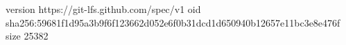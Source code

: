 version https://git-lfs.github.com/spec/v1
oid sha256:59681f1d95a3b9f6f123662d052e6f0b31dcd1d650940b12657e11bc3e8e476f
size 25382
